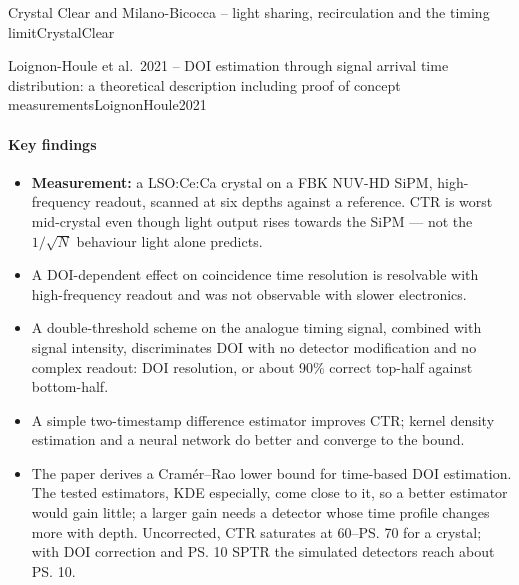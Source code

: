 \begin{programnote}{Crystal Clear and Milano-Bicocca -- light sharing, recirculation and the timing limit}{CrystalClear}
\begin{papernote}{Loignon-Houle et al.\ 2021 -- DOI estimation through signal arrival time distribution: a theoretical description including proof of concept measurements}{LoignonHoule2021}
\paragraph{Key findings}
\begin{itemize}
	\item \textbf{Measurement:} a  LSO:Ce:Ca
		crystal on a  FBK NUV-HD SiPM, high-frequency
		readout, scanned at six depths against a  reference. CTR is
		worst mid-crystal even though light output rises towards the SiPM ---
		not the $1/\sqrt{N}$ behaviour light alone predicts.
	\item A DOI-dependent effect on coincidence time resolution is resolvable
		with high-frequency readout and was not observable with slower
		electronics.
	\item A double-threshold scheme on the analogue timing signal, combined
		with signal intensity, discriminates DOI with no detector modification
		and no complex readout:  DOI resolution, or about 90\%
		correct top-half against bottom-half.
	\item A simple two-timestamp difference estimator improves CTR; kernel
		density estimation and a neural network do better and converge to the
		bound.
	\item The paper derives a Cramér--Rao lower bound for time-based DOI
		estimation. The tested estimators, KDE especially, come close to it,
		so a better estimator would gain little; a larger gain needs a detector
		whose time profile changes more with depth. Uncorrected, CTR saturates
		at 60--\ps{70} for a  crystal; with DOI correction and
		\ps{10} SPTR the simulated detectors reach about \ps{10}.
\end{itemize}


\end{papernote}
\end{programnote}
